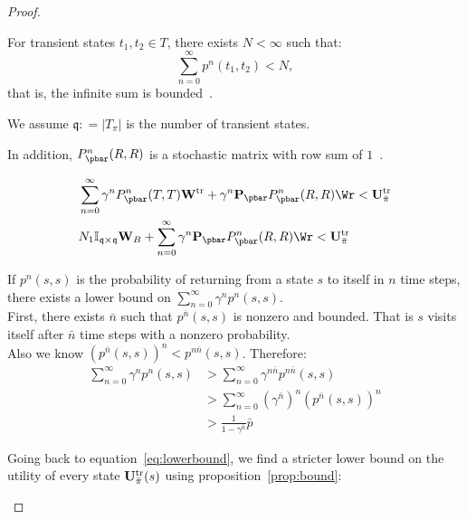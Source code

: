 \begin{proof}
\begin{itemize}
\begin{prop}
\label{prop:N}
For transient states $t_1, t_2 \in T$,  there exists $N < \infty$ such that:
\begin{equation}
 \sum_{n=0}^{\infty} p^n(t_1,t_2) < N,
 \end{equation}
that is, the infinite sum is bounded~\cite{Durrett2012}. 
\end{prop}



We assume $\mathfrak{q} : = |T_{\pi}|$ is the number of transient states.

In addition, $P_{\pbar}^n(R,R)$ is a stochastic matrix with row sum of $1$~\cite{Durrett2012}.


\begin{align}
\label{eq:lowerbound}
 &\sum_{n = 0}^\infty \gamma^n P_{\pbar}^n(T,T){\bf W}^{\text{tr}} +
 \gamma^n {\bf P}_{\pbar}P_{\pbar}^n(R,R) \Wr < {\bf U}_{\bar{\pi}}^{\text{tr}} \\
 &N_1 \mathbb{I}_{\mathfrak{q} \times \mathfrak{q}}{\bf W}_B  + 
 \sum_{n=0}^\infty \gamma^n {\bf P}_{\pbar}P_{\pbar}^n(R,R) \Wr  < {\bf U}_{\bar{\pi}}^{\text{tr}}
 \end{align}







\begin{prop}
\label{prop:bound}
If $p^n(s,s)$ is the probability of returning from a state $s$ to itself in $n$ time steps, there exists a lower bound on $\sum_{n=0}^\infty \gamma^n p^n(s,s)$.\\ 
First, there exists $\bar{n}$ such that $p^{\bar{n}}(s,s)$ is nonzero and bounded. That is $s$ visits itself after $\bar{n}$ time steps with a nonzero probability. \\
Also we know
$(p^{\bar{n}}(s,s))^n < p^{n\bar{n}}(s,s) $. Therefore:
\begin{align}
 \sum_{n=0}^\infty \gamma^n p^n(s,s) & >\sum_{n=0}^\infty \gamma^{n\bar{n}}p^{n\bar{n}}(s,s) \\
& >\sum_{n=0}^\infty (\gamma^{\bar{n}})^n (p^{\bar{n}}(s,s))^n  \\
&>\frac{1}{1-\gamma^{\bar{n}}} \bar{p} 
\end{align}
\end{prop}







 Going back to equation~\eqref{eq:lowerbound}, we find a stricter lower bound on the utility of every state ${\bf U}_{\bar{\pi}}^{\text{tr}}(s)$ using proposition~\ref{prop:bound}:



\end{itemize}
\end{proof}
